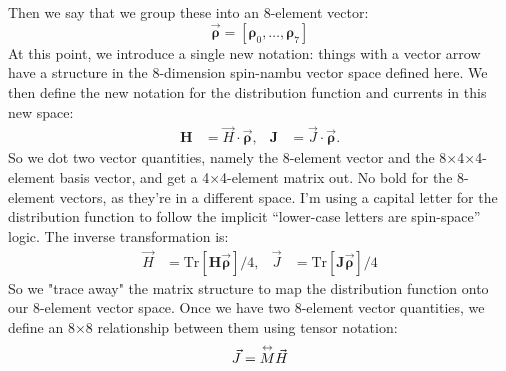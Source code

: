 Then we say that we group these into an 8-element vector:
\begin{equation}
  \vec{\bm\rho} = [\bm\rho_0, \ldots, \bm\rho_7]
\end{equation}
At this point, we introduce a single new notation: things with a vector arrow have a structure in the 8-dimension spin-nambu vector space defined here.
We then define the new notation for the distribution function and currents in this new space:
\begin{align}
  \bm{H} &= \vec{H} \cdot \vec{\bm{\rho}}, &
  \bm{J} &= \vec{J} \cdot \vec{\bm{\rho}}.
\end{align}
So we dot two vector quantities, namely the 8-element vector and the 8×4×4-element basis vector, and get a 4×4-element matrix out.
No bold for the 8-element vectors, as they're in a different space.
I'm using a capital letter for the distribution function to follow the implicit ``lower-case letters are spin-space'' logic.
The inverse transformation is:
\begin{align}
  \vec{H} &= \text{Tr}[ \bm{H} \vec{\bm{\rho}} ] / 4, &
  \vec{J} &= \text{Tr}[ \bm{J} \vec{\bm{\rho}} ] / 4
\end{align}
So we "trace away" the matrix structure to map the distribution function onto our 8-element vector space.
Once we have two 8-element vector quantities, we define an 8×8 relationship between them using tensor notation:
\begin{align}
  \vec{J} = \overset{\text{\scriptsize$\leftrightarrow$}}{M} \vec{H}
\end{align}
